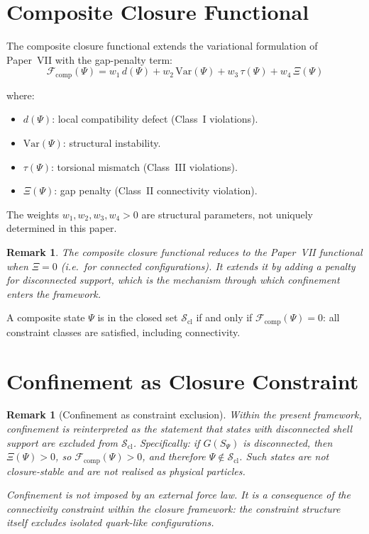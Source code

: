 \documentclass[12pt]{article}
\newtheorem{remark}[theorem]{Remark}
\newcommand{\Fcal}{\mathcal{F}}
\newcommand{\Scl}{\mathcal{S}_{\mathrm{cl}}}
\begin{document}
\section{Composite Closure Functional}\label{sec:functional}

The composite closure functional extends the variational formulation of Paper~VII with the gap-penalty term:
\begin{equation}\label{eq:compfunctional}
    \Fcal_{\mathrm{comp}}(\Psi) = w_1\, d(\Psi) + w_2\, \mathrm{Var}(\Psi) + w_3\, \tau(\Psi) + w_4\, \Xi(\Psi)
\end{equation}

where:
\begin{itemize}
    \item $d(\Psi)$: local compatibility defect (Class~I violations).
    \item $\mathrm{Var}(\Psi)$: structural instability.
    \item $\tau(\Psi)$: torsional mismatch (Class~III violations).
    \item $\Xi(\Psi)$: gap penalty (Class~II connectivity violation).
\end{itemize}

The weights $w_1, w_2, w_3, w_4 > 0$ are structural parameters, not uniquely determined in this paper.

\begin{remark}
The composite closure functional reduces to the Paper~VII functional when $\Xi = 0$ (i.e.\ for connected configurations). It extends it by adding a penalty for disconnected support, which is the mechanism through which confinement enters the framework.
\end{remark}

A composite state $\Psi$ is in the closed set $\Scl$ if and only if $\Fcal_{\mathrm{comp}}(\Psi) = 0$: all constraint classes are satisfied, including connectivity.

\section{Confinement as Closure Constraint}\label{sec:confinement}

\begin{remark}[Confinement as constraint exclusion]\label{rem:confinement}
Within the present framework, confinement is reinterpreted as the statement that states with disconnected shell support are excluded from $\Scl$. Specifically: if $G(S_\Psi)$ is disconnected, then $\Xi(\Psi) > 0$, so $\Fcal_{\mathrm{comp}}(\Psi) > 0$, and therefore $\Psi \notin \Scl$. Such states are not closure-stable and are not realised as physical particles.

Confinement is not imposed by an external force law. It is a consequence of the connectivity constraint within the closure framework: the constraint structure itself excludes isolated quark-like configurations.
\end{remark}
\end{document}
